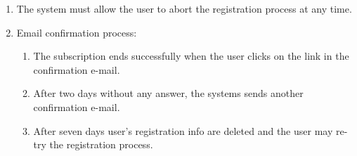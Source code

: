 \begin{enumerate}
    \item The system must allow the user to abort the registration process at any time.
    \item Email confirmation process:
    \begin{enumerate}
    \item The subscription ends successfully when the user clicks on the link in the confirmation e-mail.
    \item After two days without any answer, the systems sends another confirmation e-mail.
    \item After seven days user's registration info are deleted and the user may re-try the registration process.  \label{f-confirm}
   \end{enumerate}
\end{enumerate}
